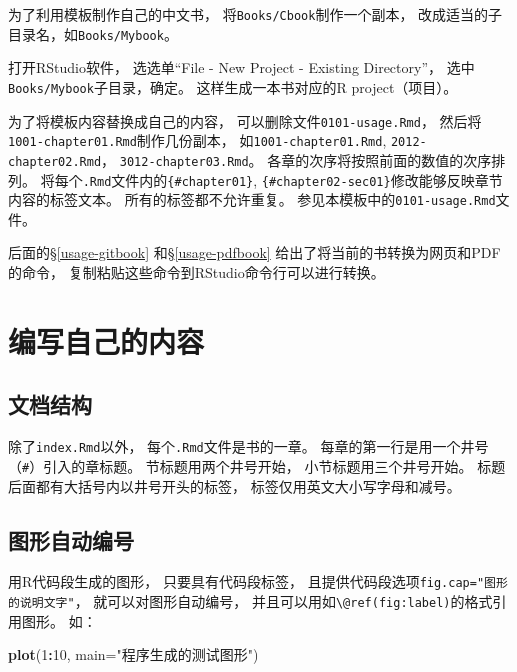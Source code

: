 \documentclass[
]{book}
\newenvironment{Shaded}{\begin{snugshade}}{\end{snugshade}}
\newcommand{\DataTypeTok}[1]{\textcolor[rgb]{0.13,0.29,0.53}{#1}}
\newcommand{\DecValTok}[1]{\textcolor[rgb]{0.00,0.00,0.81}{#1}}
\newcommand{\KeywordTok}[1]{\textcolor[rgb]{0.13,0.29,0.53}{\textbf{#1}}}
\newcommand{\NormalTok}[1]{#1}
\newcommand{\OperatorTok}[1]{\textcolor[rgb]{0.81,0.36,0.00}{\textbf{#1}}}
\newcommand{\StringTok}[1]{\textcolor[rgb]{0.31,0.60,0.02}{#1}}
\theoremstyle{definition}
\theoremstyle{definition}
\theoremstyle{definition}
\theoremstyle{definition}
\theoremstyle{remark}
\begin{document}
为了利用模板制作自己的中文书，
将\texttt{Books/Cbook}制作一个副本，
改成适当的子目录名，如\texttt{Books/Mybook}。

打开RStudio软件，
选选单``File - New Project - Existing Directory''，
选中\texttt{Books/Mybook}子目录，确定。
这样生成一本书对应的R project（项目）。

为了将模板内容替换成自己的内容，
可以删除文件\texttt{0101-usage.Rmd}，
然后将\texttt{1001-chapter01.Rmd}制作几份副本，
如\texttt{1001-chapter01.Rmd}, \texttt{2012-chapter02.Rmd}，
\texttt{3012-chapter03.Rmd}。
各章的次序将按照前面的数值的次序排列。
将每个\texttt{.Rmd}文件内的\texttt{\{\#chapter01\}}, \texttt{\{\#chapter02-sec01\}}修改能够反映章节内容的标签文本。
所有的标签都不允许重复。
参见本模板中的\texttt{0101-usage.Rmd}文件。

后面的§\ref{usage-gitbook} 和§\ref{usage-pdfbook} 给出了将当前的书转换为网页和PDF的命令，
复制粘贴这些命令到RStudio命令行可以进行转换。

\hypertarget{usage-writing}{%
\section{编写自己的内容}\label{usage-writing}}

\hypertarget{usage-writing-struct}{%
\subsection{文档结构}\label{usage-writing-struct}}

除了\texttt{index.Rmd}以外，
每个\texttt{.Rmd}文件是书的一章。
每章的第一行是用一个井号（\texttt{\#}）引入的章标题。
节标题用两个井号开始，
小节标题用三个井号开始。
标题后面都有大括号内以井号开头的标签，
标签仅用英文大小写字母和减号。

\hypertarget{usage-writing-fig}{%
\subsection{图形自动编号}\label{usage-writing-fig}}

用R代码段生成的图形，
只要具有代码段标签，
且提供代码段选项\texttt{fig.cap="图形的说明文字"}，
就可以对图形自动编号，
并且可以用如\texttt{\textbackslash{}@ref(fig:label)}的格式引用图形。
如：

\begin{Shaded}
\begin{Highlighting}[]
\KeywordTok{plot}\NormalTok{(}\DecValTok{1}\OperatorTok{:}\DecValTok{10}\NormalTok{, }\DataTypeTok{main=}\StringTok{"程序生成的测试图形"}\NormalTok{)}
\end{Highlighting}
\end{Shaded}
\end{document}
